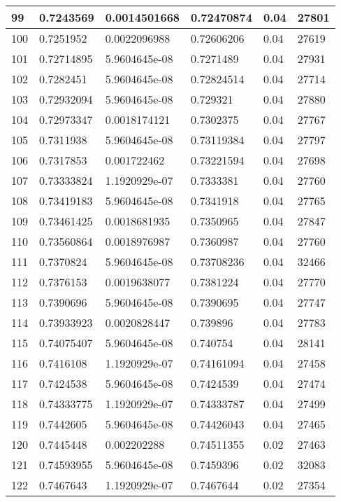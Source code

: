 \begin{longtable}{|l|l|l|l|l|l|}
99 & 0.7243569 & 0.0014501668 & 0.72470874 & 0.04 & 27801 \\ \hline 
100 & 0.7251952 & 0.0022096988 & 0.72606206 & 0.04 & 27619 \\ \hline 
101 & 0.72714895 & 5.9604645e-08 & 0.7271489 & 0.04 & 27931 \\ \hline 
102 & 0.7282451 & 5.9604645e-08 & 0.72824514 & 0.04 & 27714 \\ \hline 
103 & 0.72932094 & 5.9604645e-08 & 0.729321 & 0.04 & 27880 \\ \hline 
104 & 0.72973347 & 0.0018174121 & 0.7302375 & 0.04 & 27767 \\ \hline 
105 & 0.7311938 & 5.9604645e-08 & 0.73119384 & 0.04 & 27797 \\ \hline 
106 & 0.7317853 & 0.001722462 & 0.73221594 & 0.04 & 27698 \\ \hline 
107 & 0.73333824 & 1.1920929e-07 & 0.7333381 & 0.04 & 27760 \\ \hline 
108 & 0.73419183 & 5.9604645e-08 & 0.7341918 & 0.04 & 27765 \\ \hline 
109 & 0.73461425 & 0.0018681935 & 0.7350965 & 0.04 & 27847 \\ \hline 
110 & 0.73560864 & 0.0018976987 & 0.7360987 & 0.04 & 27760 \\ \hline 
111 & 0.7370824 & 5.9604645e-08 & 0.73708236 & 0.04 & 32466 \\ \hline 
112 & 0.7376153 & 0.0019638077 & 0.7381224 & 0.04 & 27770 \\ \hline 
113 & 0.7390696 & 5.9604645e-08 & 0.7390695 & 0.04 & 27747 \\ \hline 
114 & 0.73933923 & 0.0020828447 & 0.739896 & 0.04 & 27783 \\ \hline 
115 & 0.74075407 & 5.9604645e-08 & 0.740754 & 0.04 & 28141 \\ \hline 
116 & 0.7416108 & 1.1920929e-07 & 0.74161094 & 0.04 & 27458 \\ \hline 
117 & 0.7424538 & 5.9604645e-08 & 0.7424539 & 0.04 & 27474 \\ \hline 
118 & 0.74333775 & 1.1920929e-07 & 0.74333787 & 0.04 & 27499 \\ \hline 
119 & 0.7442605 & 5.9604645e-08 & 0.74426043 & 0.04 & 27465 \\ \hline 
120 & 0.7445448 & 0.002202288 & 0.74511355 & 0.02 & 27463 \\ \hline 
121 & 0.74593955 & 5.9604645e-08 & 0.7459396 & 0.02 & 32083 \\ \hline 
122 & 0.7467643 & 1.1920929e-07 & 0.7467644 & 0.02 & 27354 \\ \hline 

\end{longtable}

